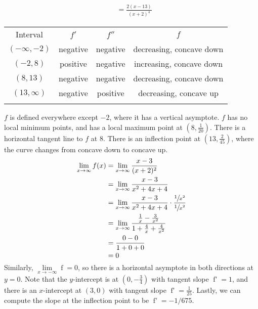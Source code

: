 \documentclass[12pt,]{book}
\theoremstyle{plain}
\theoremstyle{definition}
\numberwithin{equation}{section}
\newcommand{\hrulethin}  {\noalign{\hrule height 0.04em}}
\newcommand{\hrulemedium}{\noalign{\hrule height 0.07em}}
\newcommand{\hrulethick} {\noalign{\hrule height 0.11em}}
\newcommand{\fe}[2]{\mathop{{#1}{\left(#2\right)}}}
\newcommand{\ointerval}[2]{\left(#1,#2\right)}
\newcommand{\point}[2]{\left(#1,#2\right)}
\newcommand{\fd}[1]{#1'}
\newcommand{\sd}[1]{#1''}
\begin{document}
\begin{multicols}{2}
{\begin{align*}
&=\frac{2(x-13)}{(x+2)^4}
\end{align*}%
\begin{tabular}{cccc}\hrulethick
Interval&\(\fd{f}\)&\(\sd{f}\)&\(f\)\\\hrulemedium
\(\ointerval{-\infty}{-2}\)&negative&negative&decreasing, concave down\\\hrulethin
\(\ointerval{-2}{8}\)&positive&negative&increasing, concave down\\\hrulethin
\(\ointerval{8}{13}\)&negative&negative&decreasing, concave down\\\hrulethin
\(\ointerval{13}{\infty}\)&negative&positive&decreasing, concave up\\\hrulethin
\end{tabular}
\par
\(f\) is defined everywhere except \(-2\), where it has a vertical asymptote. \(f\) has no local minimum points, and has a local maximum point at \(\point{8}{\frac{1}{20}}\). There is a horizontal tangent line to \(f\) at \(8\). There is an inflection point at \(\point{13}{\frac{2}{45}}\), where the curve changes from concave down to concave up. \begin{align*}
\lim_{x\to\infty}\fe{f}{x}&=\lim_{x\to\infty}\frac{x-3}{(x+2)^2}\\
&=\lim_{x\to\infty}\frac{x-3}{x^2+4x+4}\\
&=\lim_{x\to\infty}\frac{x-3}{x^2+4x+4}\cdot\frac{\sfrac{1}{x^2}}{\sfrac{1}{x^2}}\\
&=\lim_{x\to\infty}\frac{\frac{1}{x}-\frac{3}{x^2}}{1+\frac{4}{x}+\frac{4}{x^2}}\\
&=\frac{0-0}{1+0+0}\\
&=0
\end{align*}Similarly, \(\lim\limits_{x\to-\infty}\fe{f}{x}=0\), so there is a horizontal asymptote in both directions at \(y=0\). Note that the \(y\)-intercept is at \(\point{0}{-\frac{3}{4}}\) with tangent slope \(\fe{\fd{f}}{0}=1\), and there is an \(x\)-intercept at \(\point{3}{0}\) with tangent slope \(\fe{\fd{f}}{3}=\frac{1}{25}\). Lastly, we can compute the slope at the inflection point to be \(\fe{\fd{f}}{13}=-1/675\).%
{
}}
\end{multicols}
\end{document}
